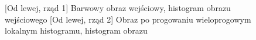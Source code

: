 \documentclass[a4paper,12pt, titlepage]{report}
\begin{document}
\FloatBarrier
\begin{figure}[h]
    \centering
    \qquad
    \caption{[Od lewej, rząd 1] Barwowy obraz wejściowy, histogram obrazu wejściowego [Od lewej, rząd 2] Obraz po progowaniu wieloprogowym lokalnym histogramu, histogram obrazu}%
    \label{fig:rysunek}%
\end{figure}
\FloatBarrier
\end{document}
